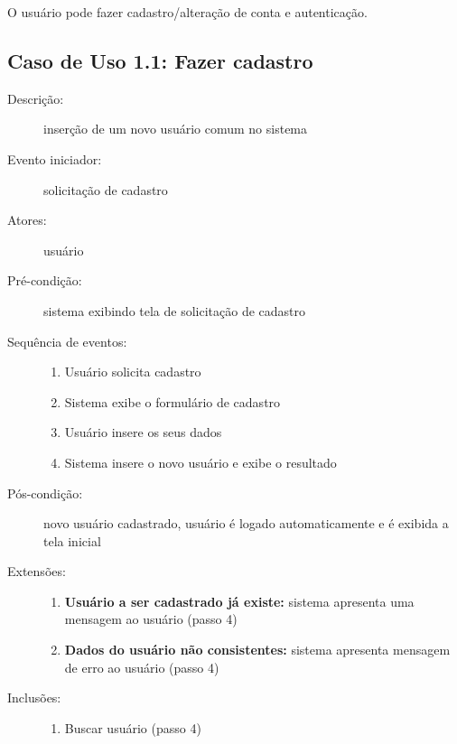O usuário pode fazer cadastro/alteração de conta e autenticação.

\subsection{Caso de Uso 1.1: Fazer cadastro}
\begin{description}
	\item[Descrição:] inserção de um novo usuário comum no sistema
	\item[Evento iniciador:] solicitação de cadastro
	\item[Atores:] usuário
	\item[Pré-condição:] sistema exibindo tela de solicitação de cadastro
	\item[Sequência de eventos:] \hfill
		\begin{enumerate}
			\item{Usuário solicita cadastro}
			\item{Sistema exibe o formulário de cadastro}
			\item{Usuário insere os seus dados}
			\item{Sistema insere o novo usuário e exibe o resultado}
		\end{enumerate}
	\item[Pós-condição:] novo usuário cadastrado, usuário é logado automaticamente e é exibida a tela inicial
	\item[Extensões:] \hfill
		\begin{enumerate}
			\item{\textbf{Usuário a ser cadastrado já existe:} sistema apresenta uma mensagem ao usuário (passo 4)}
			\item{\textbf{Dados do usuário não consistentes:} sistema apresenta mensagem de erro ao usuário (passo 4)}
		\end{enumerate}
	\item[Inclusões:] \hfill
		\begin{enumerate}
			\item{Buscar usuário (passo 4)}
		\end{enumerate}
\end{description}
%
